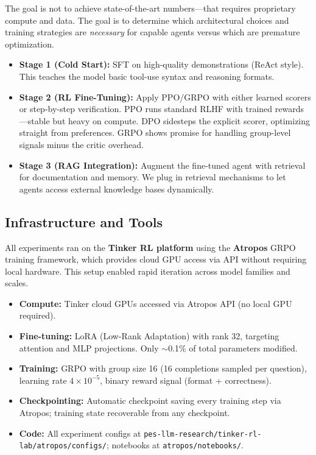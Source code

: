\documentclass[12pt,a4paper]{report}
\theoremstyle{definition}
\begin{document}
The goal is not to achieve state-of-the-art numbers---that requires proprietary compute and data. The goal is to determine which architectural choices and training strategies are \textit{necessary} for capable agents versus which are premature optimization.

\begin{itemize}
    \item \textbf{Stage 1 (Cold Start):} SFT on high-quality demonstrations (ReAct style). This teaches the model basic tool-use syntax and reasoning formats.
    \item \textbf{Stage 2 (RL Fine-Tuning):} Apply PPO/GRPO with either learned scorers or step-by-step verification. PPO runs standard RLHF with trained rewards---stable but heavy on compute. DPO sidesteps the explicit scorer, optimizing straight from preferences. GRPO shows promise for handling group-level signals minus the critic overhead.
    \item \textbf{Stage 3 (RAG Integration):} Augment the fine-tuned agent with retrieval for documentation and memory. We plug in retrieval mechanisms to let agents access external knowledge bases dynamically.
\end{itemize}

\subsection{Infrastructure and Tools}
All experiments ran on the \textbf{Tinker RL platform} using the \textbf{Atropos} GRPO training framework, which provides cloud GPU access via API without requiring local hardware. This setup enabled rapid iteration across model families and scales.

\begin{itemize}
    \item \textbf{Compute:} Tinker cloud GPUs accessed via Atropos API (no local GPU required).
    \item \textbf{Fine-tuning:} LoRA (Low-Rank Adaptation) with rank 32, targeting attention and MLP projections. Only $\sim$0.1\% of total parameters modified.
    \item \textbf{Training:} GRPO with group size 16 (16 completions sampled per question), learning rate $4 \times 10^{-5}$, binary reward signal (format + correctness).
    \item \textbf{Checkpointing:} Automatic checkpoint saving every training step via Atropos; training state recoverable from any checkpoint.
    \item \textbf{Code:} All experiment configs at \texttt{pes-llm-research/tinker-rl-lab/atropos/configs/}; notebooks at \texttt{atropos/notebooks/}.
\end{itemize}
\end{document}
